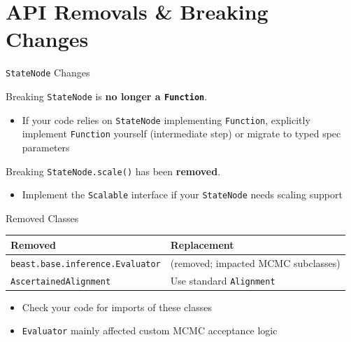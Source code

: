 \documentclass[aspectratio=169,11pt]{beamer}
\newcommand{\code}[1]{\texttt{#1}}
\begin{document}
\section{API Removals \& Breaking Changes}

\begin{frame}{\code{StateNode} Changes}
\begin{alertblock}{Breaking}
\code{StateNode} is \textbf{no longer a \code{Function}}.
\end{alertblock}

\begin{itemize}
\item If your code relies on \code{StateNode} implementing \code{Function}, explicitly implement \code{Function} yourself (intermediate step) or migrate to typed spec parameters
\end{itemize}

\vspace{1em}
\begin{alertblock}{Breaking}
\code{StateNode.scale()} has been \textbf{removed}.
\end{alertblock}

\begin{itemize}
\item Implement the \code{Scalable} interface if your \code{StateNode} needs scaling support
\end{itemize}
\end{frame}

\begin{frame}{Removed Classes}
\begin{center}
\begin{tabular}{ll}
\toprule
\textbf{Removed} & \textbf{Replacement} \\
\midrule
\code{beast.base.inference.Evaluator} & (removed; impacted MCMC subclasses) \\
\code{AscertainedAlignment} & Use standard \code{Alignment} \\
\bottomrule
\end{tabular}
\end{center}
\vspace{1em}
\begin{itemize}
\item Check your code for imports of these classes
\item \code{Evaluator} mainly affected custom MCMC acceptance logic
\end{itemize}
\end{frame}
\end{document}
